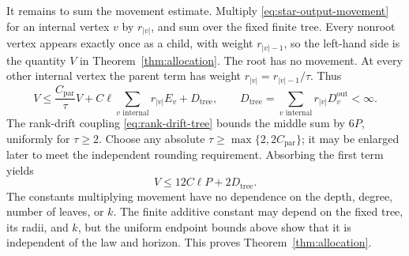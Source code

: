 It remains to sum the movement estimate.  Multiply
\eqref{eq:star-output-movement} for an internal vertex \(v\) by
\(r_{|v|}\), and sum over the fixed finite tree.  Every nonroot
vertex appears exactly once as a child, with weight
\(r_{|v|-1}\), so the left-hand side is the quantity \(V\) in
Theorem~\ref{thm:allocation}.  The root has no movement.  At every
other internal vertex the parent term has weight
\(r_{|v|}=r_{|v|-1}/\tau\).  Thus
\begin{equation}
 V\le \frac{C_{\mathrm{par}}}{\tau}V
        +C\ell\sum_{v\text{ internal}}r_{|v|}E_v
        +D_{\mathrm{tree}},
 \qquad
 D_{\mathrm{tree}}=
    \sum_{v\text{ internal}}r_{|v|}D_v^{\mathrm{out}}<\infty.
 \label{eq:allocation-absorption}
\end{equation}
The rank-drift coupling \eqref{eq:rank-drift-tree} bounds the
middle sum by \(6P\), uniformly for \(\tau\ge2\).  Choose any
absolute \(\tau\ge\max\{2,2C_{\mathrm{par}}\}\); it may be
enlarged later to meet the independent rounding requirement.
Absorbing the first term yields
\[
 V\le 12C\ell P+2D_{\mathrm{tree}}.
\]
The constants multiplying movement have no dependence on the
depth, degree, number of leaves, or \(k\).  The finite additive
constant may depend on the fixed tree, its radii, and \(k\), but
the uniform endpoint bounds above show that it is independent
of the law and horizon.  This proves Theorem~\ref{thm:allocation}.

